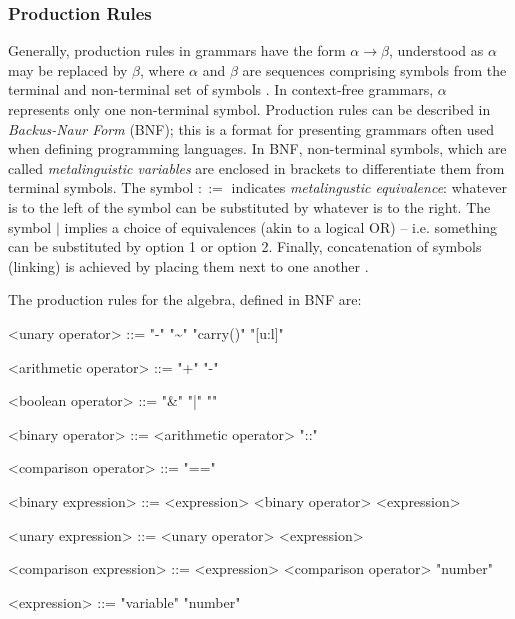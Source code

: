 \subsubsection{Production Rules}
Generally, production rules in grammars have the form $\alpha \rightarrow \beta$, understood as $\alpha$ may be replaced by $\beta$, where $\alpha$ and $\beta$ are sequences comprising symbols from the terminal and non-terminal set of symbols \cite{jäger_rogers_2012}. In context-free grammars, $\alpha$ represents only one non-terminal symbol. Production rules can be described in \textit{Backus-Naur Form} (BNF); this is a format for presenting grammars often used when defining programming languages. In BNF, non-terminal symbols, which are called \textit{metalinguistic variables} are enclosed in brackets to differentiate them from terminal symbols. The symbol $::=$ indicates \textit{metalingustic equivalence}: whatever is to the left of the symbol can be substituted by whatever is to the right. The symbol $|$ implies a choice of equivalences (akin to a logical OR) -- i.e. something can be substituted by option 1 or option 2. Finally, concatenation of symbols (linking) is achieved by placing them next to one another \cite{bnf}. 

The production rules for the algebra, defined in BNF are: 

\setlength{\grammarparsep}{0.25cm}   %
\setlength{\grammarindent}{4.5cm}
\begin{center}
\begin{grammar}
    <unary operator> ::= "-" \alt "\sim" \alt "carry()" \alt "[u:l]"
    
    <arithmetic operator> ::= "+" \alt "-"
    
    <boolean operator> ::= "\&" \alt "|" \alt "\bigoplus"
    
    <binary operator> ::= <arithmetic operator>  \alt "::"

    <comparison operator> ::= "=="
    
    <binary expression> ::= <expression> <binary operator> <expression>
    
    <unary expression> ::= <unary operator> <expression>
    
    <comparison expression> ::= <expression> <comparison operator> "number"
    
    <expression> ::= "variable" \alt "number"   
\end{grammar}
\end{center}

